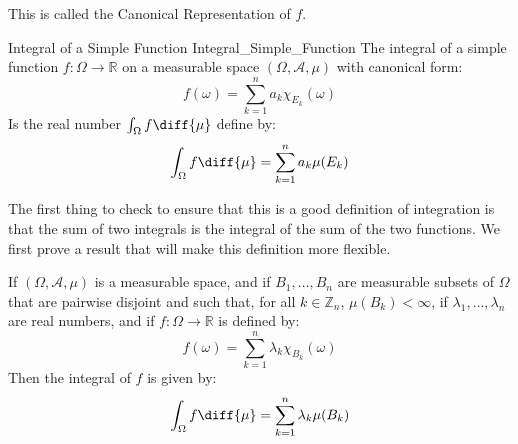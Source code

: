             This is called the \textrm{Canonical Representation}
            of $f$.
            \begin{ldefinition}{Integral of a Simple Function}
                  {Integral_Simple_Function}
                The integral of a simple function
                $f:\Omega\rightarrow\mathbb{R}$ on a measurable
                space $(\Omega,\mathcal{A},\mu)$ with canonical
                form:
                \begin{equation}
                    f(\omega)=\sum_{k=1}^{n}
                        a_{k}\chi_{E_{k}}(\omega)
                \end{equation}
                Is the real number $\int_{\Omega}f\diff{\mu}$
                define by:
                \begin{equation}
                    \int_{\Omega}f\diff{\mu}=
                        \sum_{k=1}^{n}a_{k}\mu(E_{k})
                \end{equation}
            \end{ldefinition}
            The first thing to check to ensure that this is
            a good definition of integration is that the
            sum of two integrals is the integral of the sum
            of the two functions. We first prove a result that
            will make this definition more flexible.
            \begin{theorem}
                If $(\Omega,\mathcal{A},\mu)$ is a measurable
                space, and if $B_{1},\dots,B_{n}$ are measurable
                subsets of $\Omega$ that are pairwise disjoint
                and such that, for all $k\in\mathbb{Z}_{n}$,
                $\mu(B_{k})<\infty$, if
                $\lambda_{1},\dots,\lambda_{n}$ are real
                numbers, and if $f:\Omega\rightarrow\mathbb{R}$
                is defined by:
                \begin{equation}
                    f(\omega)=\sum_{k=1}^{n}
                        \lambda_{k}\chi_{B_{k}}(\omega)
                \end{equation}
                Then the integral of $f$ is given by:
                \begin{equation}
                    \int_{\Omega}f\diff{\mu}
                        =\sum_{k=1}^{n}\lambda_{k}
                        \mu(B_{k})
                \end{equation}
            \end{theorem}
